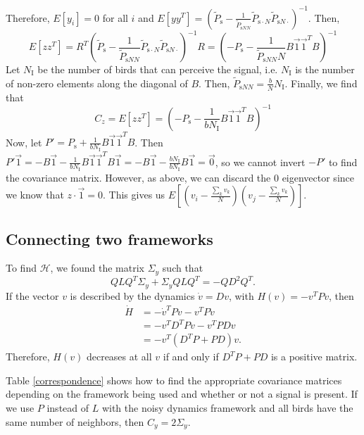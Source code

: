 \documentclass{article}
\begin{document}
Therefore, $E[y_i]=0$ for all $i$ and $E[yy^T]=(\tilde{P}_{\text{s}}-\frac{1}{\tilde{P}_{\text{s}NN}}\tilde{P}_{\text{s}\cdot N}\tilde{P}_{\text{s}N\cdot })^{-1}$. Then, 
\begin{equation*}
E[zz^T]=R^T\left(\tilde{P}_{\text{s}}-\frac{1}{\tilde{P}_{\text{s}NN}}\tilde{P}_{\text{s}\cdot N}\tilde{P}_{\text{s}N\cdot }\right)^{-1}R=\left(-P_\text{s}-\frac{1}{\tilde{P}_{\text{s}NN}N}B\vec{1}\vec{1}^TB\right)^{-1}
\end{equation*}
Let $N_\text{I}$ be the number of birds that can perceive the signal, i.e. $N_\text{I}$ is the number of non-zero elements along the diagonal of $B$. Then, $\tilde{P}_{\text{s}NN}=\frac{b}{N}N_\text{I}$. 
Finally, we find that 
\begin{equation}
C_z=E[zz^T]=\left(-P_\text{s}-\frac{1}{bN_\text{I}}B\vec{1}\vec{1}^TB\right)^{-1}
\end{equation}
Now, let $P'=P_\text{s}+\frac{1}{bN_\text{I}}B\vec{1}\vec{1}^TB$. Then $P'\vec{1}=-B\vec{1}-\frac{1}{bN_\text{I}}B\vec{1}\vec{1}^TB\vec{1}=-B\vec{1}-\frac{bN_\text{I}}{bN_\text{I}}B\vec{1}=\vec{0}$, so we cannot invert $-P'$ to find the covariance matrix. However, as above, we can discard the $0$ eigenvector since we know that $z\cdot \vec{1}=0$. This gives us $E[(v_i-\frac{\sum_kv_k}{N})(v_j-\frac{\sum_kv_k}{N})]$.

\subsection{Connecting two frameworks }
To find $\mathscr{H}$, we found the matrix $\Sigma_y$ such that 
\begin{equation}
QLQ^T\Sigma_y+\Sigma_y QLQ^T=-QD^2Q^T.
\end{equation}
If the vector $v$ is described by the dynamics $\dot{v}=Dv$, with $H(v)=-v^TPv$, then
\begin{align*}
\dot{H}&=-\dot{v}^TPv-v^TP\dot{v}
\\&=-v^TD^TPv-v^TPDv
\\&=-v^T(D^TP+PD)v.
\end{align*}
Therefore, $H(v)$ decreases at all $v$ if and only if $D^TP+PD$ is a positive matrix.

Table \ref{correspondence} shows how to find the appropriate covariance matrices depending on the framework being used and whether or not a signal is present. If we use $P$ instead of $L$ with the noisy dynamics framework and all birds have the same number of neighbors, then $C_y=2\Sigma_y$.
\end{document}

